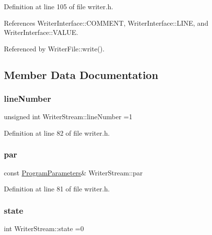 Definition at line 105 of file writer.\+h.



References Writer\+Interface\+::\+C\+O\+M\+M\+E\+NT, Writer\+Interface\+::\+L\+I\+NE, and Writer\+Interface\+::\+V\+A\+L\+UE.



Referenced by Writer\+File\+::write().



\subsection{Member Data Documentation}
\mbox{\label{classWriterStream_a513c49b4983a63adf95256219b015fee}} 
\subsubsection{\texorpdfstring{line\+Number}{lineNumber}}
{\footnotesize\ttfamily unsigned int Writer\+Stream\+::line\+Number =1\hspace{0.3cm}{\ttfamily [private]}}



Definition at line 82 of file writer.\+h.

\mbox{\label{classWriterStream_ae5f1b2651b7d7a6376cfa849f973c484}} 
\subsubsection{\texorpdfstring{par}{par}}
{\footnotesize\ttfamily const \hyperlink{structProgramParameters}{Program\+Parameters}\& Writer\+Stream\+::par\hspace{0.3cm}{\ttfamily [private]}}



Definition at line 81 of file writer.\+h.

\mbox{\label{classWriterStream_a1e6370b32d8e15098300567b38580399}} 
\subsubsection{\texorpdfstring{state}{state}}
{\footnotesize\ttfamily int Writer\+Stream\+::state =0\hspace{0.3cm}{\ttfamily [private]}}



